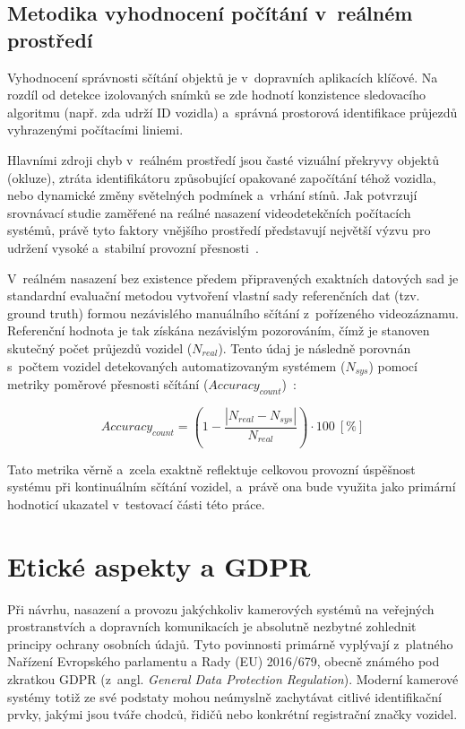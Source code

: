 \subsection{Metodika vyhodnocení počítání v~reálném prostředí}
Vyhodnocení správnosti sčítání objektů je v~dopravních aplikacích klíčové. Na rozdíl od detekce izolovaných snímků se zde hodnotí konzistence sledovacího algoritmu (např. zda udrží ID vozidla) a~správná prostorová identifikace průjezdů vyhrazenými počítacími liniemi. 

Hlavními zdroji chyb v~reálném prostředí jsou časté vizuální překryvy objektů (okluze), ztráta identifikátoru způsobující opakované započítání téhož vozidla, nebo dynamické změny světelných podmínek a~vrhání stínů. Jak potvrzují srovnávací studie zaměřené na reálné nasazení videodetekčních počítacích systémů, právě tyto faktory vnějšího prostředí představují největší výzvu pro udržení vysoké a~stabilní provozní přesnosti~\cite{zhou_traffic_survey_2024}.

V~reálném nasazení bez existence předem připravených exaktních datových sad je standardní evaluační metodou vytvoření vlastní sady referenčních dat (tzv. ground truth) formou nezávislého manuálního sčítání z~pořízeného videozáznamu. Referenční hodnota je tak získána nezávislým pozorováním, čímž je stanoven skutečný počet průjezdů vozidel ($N_{real}$). Tento údaj je následně porovnán s~počtem vozidel detekovaných automatizovaným systémem ($N_{sys}$) pomocí metriky poměrové přesnosti sčítání ($Accuracy_{count}$)~\cite{zhou_traffic_survey_2024, mdpi_roi_tracking_2022}:

$$Accuracy_{count} = \left( 1 - \frac{|N_{real} - N_{sys}|}{N_{real}} \right) \cdot 100 \ [\%]$$

Tato metrika věrně a~zcela exaktně reflektuje celkovou provozní úspěšnost systému při kontinuálním sčítání vozidel, a~právě ona bude využita jako primární hodnoticí ukazatel v~testovací části této práce.

\section{Etické aspekty a GDPR}
Při návrhu, nasazení a provozu jakýchkoliv kamerových systémů na veřejných prostranstvích a dopravních komunikacích je absolutně nezbytné zohlednit principy ochrany osobních údajů. Tyto povinnosti primárně vyplývají z~platného Nařízení Evropského parlamentu a Rady (EU) 2016/679, obecně známého pod zkratkou \acs{GDPR} (z~angl. \textit{General Data Protection Regulation}). Moderní kamerové systémy totiž ze své podstaty mohou neúmyslně zachytávat citlivé identifikační prvky, jakými jsou tváře chodců, řidičů nebo konkrétní registrační značky vozidel.

